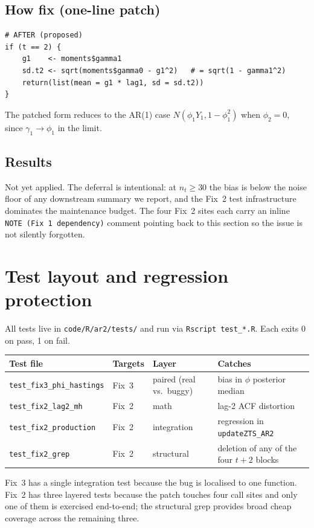 \documentclass[11pt]{article}
\begin{document}
\subsection{How fix (one-line patch)}

\begin{lstlisting}
# AFTER (proposed)
if (t == 2) {
    g1    <- moments$gamma1
    sd.t2 <- sqrt(moments$gamma0 - g1^2)   # = sqrt(1 - gamma1^2)
    return(list(mean = g1 * lag1, sd = sd.t2))
}
\end{lstlisting}
The patched form reduces to the AR(1) case $N(\phi_1 Y_1, 1 - \phi_1^2)$ when
$\phi_2 = 0$, since $\gamma_1 \to \phi_1$ in the limit.

\subsection{Results}

Not yet applied. The deferral is intentional: at $n_t \geq 30$ the bias is
below the noise floor of any downstream summary we report, and the Fix~2
test infrastructure dominates the maintenance budget. The four Fix~2 sites
each carry an inline \texttt{NOTE (Fix 1 dependency)} comment pointing back
to this section so the issue is not silently forgotten.

\section{Test layout and regression protection}\label{ar2fix:tests}

All tests live in \texttt{code/R/ar2/tests/} and run via
\texttt{Rscript test\_*.R}. Each exits 0 on pass, 1 on fail.
\begin{center}
\begin{tabular}{llll}
\toprule
\textbf{Test file}                 & \textbf{Targets} & \textbf{Layer}         & \textbf{Catches}                                       \\
\midrule
\texttt{test\_fix3\_phi\_hastings} & Fix~3            & paired (real vs.\ buggy) & bias in $\phi$ posterior median               \\
\texttt{test\_fix2\_lag2\_mh}      & Fix~2            & math                   & lag-2 ACF distortion                                  \\
\texttt{test\_fix2\_production}    & Fix~2            & integration            & regression in \texttt{updateZTS\_AR2}                 \\
\texttt{test\_fix2\_grep}          & Fix~2            & structural             & deletion of any of the four $t+2$ blocks              \\
\bottomrule
\end{tabular}
\end{center}
Fix~3 has a single integration test because the bug is localised to one
function. Fix~2 has three layered tests because the patch touches four call
sites and only one of them is exercised end-to-end; the structural grep
provides broad cheap coverage across the remaining three.
\end{document}
